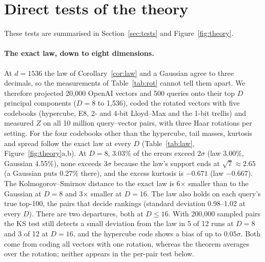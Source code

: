 \documentclass[10pt]{article}
\begin{document}
\section{Direct tests of the theory}\label{sn:tests}
These tests are summarised in Section~\ref{sec:tests} and Figure~\ref{fig:theory}.

\paragraph{The exact law, down to eight dimensions.} At $d=1536$ the law of Corollary~\ref{cor:law} and a Gaussian agree to three decimals, so the measurements of Table~\ref{tab:rot} cannot tell them apart. We therefore projected 20{,}000 OpenAI vectors and 500 queries onto their top $D$ principal components ($D=8$ to 1{,}536), coded the rotated vectors with five codebooks (hypercube, E8, 2- and 4-bit Lloyd--Max and the 1-bit trellis) and measured $Z$ on all 10 million query--vector pairs, with three Haar rotations per setting. For the four codebooks other than the hypercube, tail masses, kurtosis and spread follow the exact law at every $D$ (Table~\ref{tab:law}, Figure~\ref{fig:theory}a,b). At $D=8$, 3.03\% of the errors exceed $2\sigma$ (law 3.00\%, Gaussian 4.55\%), none exceeds $3\sigma$ because the law's support ends at $\sqrt7\approx2.65$ (a Gaussian puts 0.27\% there), and the excess kurtosis is $-0.671$ (law $-0.667$). The Kolmogorov--Smirnov distance to the exact law is 6$\times$ smaller than to the Gaussian at $D=8$ and 3$\times$ smaller at $D=16$. The law also holds on each query's true top-100, the pairs that decide rankings (standard deviation 0.98--1.02 at every $D$). There are two departures, both at $D\le16$. With 200{,}000 sampled pairs the KS test still detects a small deviation from the law in 5 of 12 runs at $D=8$ and 3 of 12 at $D=16$, and the hypercube code shows a bias of up to $0.05\sigma$. Both come from coding all vectors with one rotation, whereas the theorem averages over the rotation; neither appears in the per-pair test below.
\end{document}
